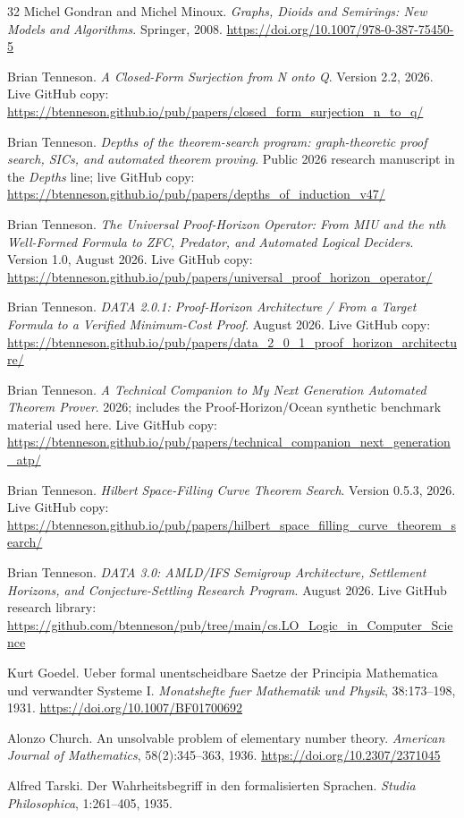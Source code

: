 \begin{thebibliography}{32}
Michel Gondran and Michel Minoux.
\emph{Graphs, Dioids and Semirings: New Models and Algorithms}.
Springer, 2008.
\url{https://doi.org/10.1007/978-0-387-75450-5}

Brian Tenneson.
\emph{A Closed-Form Surjection from N onto Q}.
Version 2.2, 2026. Live GitHub copy:
\url{https://btenneson.github.io/pub/papers/closed_form_surjection_n_to_q/}

Brian Tenneson.
\emph{Depths of the theorem-search program: graph-theoretic proof search, SICs, and automated theorem proving}.
Public 2026 research manuscript in the \emph{Depths} line; live GitHub copy:
\url{https://btenneson.github.io/pub/papers/depths_of_induction_v47/}

Brian Tenneson.
\emph{The Universal Proof-Horizon Operator: From MIU and the nth Well-Formed Formula to ZFC, Predator, and Automated Logical Deciders}.
Version 1.0, August 2026. Live GitHub copy:
\url{https://btenneson.github.io/pub/papers/universal_proof_horizon_operator/}

Brian Tenneson.
\emph{DATA 2.0.1: Proof-Horizon Architecture / From a Target Formula to a Verified Minimum-Cost Proof}.
August 2026. Live GitHub copy:
\url{https://btenneson.github.io/pub/papers/data_2_0_1_proof_horizon_architecture/}

Brian Tenneson.
\emph{A Technical Companion to My Next Generation Automated Theorem Prover}.
2026; includes the Proof-Horizon/Ocean synthetic benchmark material used here. Live GitHub copy:
\url{https://btenneson.github.io/pub/papers/technical_companion_next_generation_atp/}

Brian Tenneson.
\emph{Hilbert Space-Filling Curve Theorem Search}.
Version 0.5.3, 2026. Live GitHub copy:
\url{https://btenneson.github.io/pub/papers/hilbert_space_filling_curve_theorem_search/}

Brian Tenneson.
\emph{DATA 3.0: AMLD/IFS Semigroup Architecture, Settlement Horizons, and Conjecture-Settling Research Program}.
August 2026. Live GitHub research library:
\url{https://github.com/btenneson/pub/tree/main/cs.LO_Logic_in_Computer_Science}

Kurt Goedel.
Ueber formal unentscheidbare Saetze der Principia Mathematica und verwandter Systeme I.
\emph{Monatshefte fuer Mathematik und Physik}, 38:173--198, 1931.
\url{https://doi.org/10.1007/BF01700692}

Alonzo Church.
An unsolvable problem of elementary number theory.
\emph{American Journal of Mathematics}, 58(2):345--363, 1936.
\url{https://doi.org/10.2307/2371045}

Alfred Tarski.
Der Wahrheitsbegriff in den formalisierten Sprachen.
\emph{Studia Philosophica}, 1:261--405, 1935.

\end{thebibliography}


